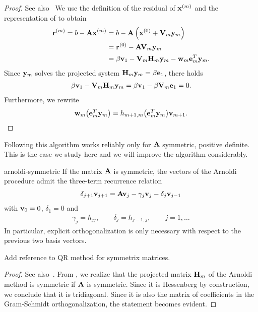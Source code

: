 \begin{proof}
  See also~\cite[Proposition 6.7]{Saad00}
  We use the definition of the residual of $\mathbf x^{(m)}$ and the representation of  to obtain
  \begin{align}
    \mathbf r^{(m)} = b-\mathbf A\mathbf x^{(m)}
    &= b- \mathbf A\left(\mathbf x^{(0)} + \mathbf V_m\mathbf y_m\right)\\
    &=\mathbf r^{(0)} - \mathbf A\mathbf V_m\mathbf y_m\\
    &= \beta\mathbf v_1 - \mathbf V_m\mathbf H_m\mathbf y_m - \mathbf w_m\mathbf e_m^T\mathbf y_m.
  \end{align}
  Since $\mathbf y_m$ solves the projected system
  $\mathbf H_m\mathbf y_m = \beta\mathbf e_1$, there holds
  \begin{gather}
    \beta\mathbf v_1 - \mathbf V_m\mathbf H_m\mathbf y_m = \beta\mathbf v_1 - \beta \mathbf V_m\mathbf e_1 = 0.
  \end{gather}
  Furthermore, we rewrite
  \begin{gather}
    \mathbf w_m\bigl(\mathbf e_m^T\mathbf y_m\bigr) = h_{m+1,m} \bigl(\mathbf e_m^T\mathbf y_m\bigr) \mathbf v_{m+1}.
  \end{gather}
\end{proof}

\begin{remark}
  Following  this algorithm
  works reliably only for $\mathbf A$ symmetric, positive definite. This
  is the case we study here and we will improve the algorithm
  considerably.
\end{remark}

\begin{Lemma}{arnoldi-symmetric}
  If the matrix $\mathbf A$ is symmetric, the vectors of the Arnoldi
  procedure admit the three-term recurrence relation
  \begin{gather}
    \delta_{j+1}\mathbf v_{j+1} = \mathbf A \mathbf v_j - \gamma_j \mathbf v_j - \delta_j\mathbf v_{j-1}
  \end{gather}
  with $\mathbf v_0 = 0$, $\delta_1 = 0$ and
  \begin{gather}
    \gamma_j =  h_{jj}, \qquad \delta_j = h_{j-1,j},
    \qquad j=1,\dots
  \end{gather}
  In particular, explicit orthogonalization is only necessary with respect to
  the previous two basis vectors.
\end{Lemma}

\begin{todo}
  Add reference to QR method for symmetrix matrices.
\end{todo}
\begin{proof}
  See also~\cite[Section 6.6.1]{Saad00}. From
  , we realize that the
  projected matrix $\mathbf H_m$ of the Arnoldi method is symmetric if
  $\mathbf A$ is symmetric. Since it is Hessenberg by construction, we
  conclude that it is tridiagonal. Since it is also the matrix of
  coefficients in the Gram-Schmidt orthogonalization, the statement
  becomes evident.
\end{proof}

